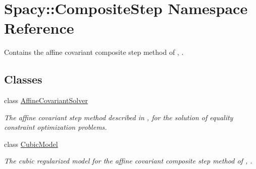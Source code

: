 \hypertarget{namespaceSpacy_1_1CompositeStep}{\section{Spacy\-:\-:Composite\-Step Namespace Reference}
\label{namespaceSpacy_1_1CompositeStep}
}


Contains the affine covariant composite step method of \cite{Lubkoll2015}, \cite{Lubkoll2015a}.  


\subsection*{Classes}
\begin{DoxyCompactItemize}
\item 
class \hyperlink{classSpacy_1_1CompositeStep_1_1AffineCovariantSolver}{Affine\-Covariant\-Solver}
\begin{DoxyCompactList}\small\item\em The affine covariant step method described in \cite{Lubkoll2015}, \cite{Lubkoll2015a} for the solution of equality constraint optimization problems. \end{DoxyCompactList}\item 
class \hyperlink{classSpacy_1_1CompositeStep_1_1CubicModel}{Cubic\-Model}
\begin{DoxyCompactList}\small\item\em The cubic regularized model for the affine covariant composite step method of \cite{Lubkoll2015}, \cite{Lubkoll2015a}. \end{DoxyCompactList}\end{DoxyCompactItemize}
